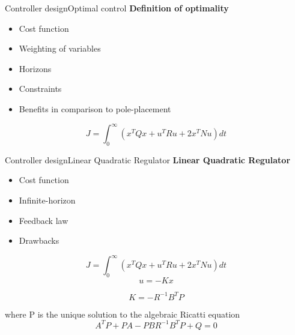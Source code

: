 \begin{frame}{Controller design}{Optimal control}
	 \textbf{Definition of optimality}
	 \begin{itemize}
	 	\item Cost function
	 	\item Weighting of variables
	 	\item Horizons
	 	\item Constraints
	 	\item Benefits in comparison to pole-placement 
	 \end{itemize}
 
\begin{equation} \label{eq:lqr_cost_fcn}
	J = \int_0^{\infty} \left(x^TQx + u^TRu + 2x^TNu\right)dt
\end{equation}

\end{frame}


\begin{frame}{Controller design}{Linear Quadratic Regulator}
	 \textbf{Linear Quadratic Regulator}
	\begin{itemize}
		\item Cost function
		\item Infinite-horizon 
		\item Feedback law
		\item Drawbacks
	\end{itemize}

\begin{equation} \label{eq:lqr_cost_fcn}
	J = \int_0^{\infty} \left(x^TQx + u^TRu + 2x^TNu\right)dt
\end{equation}
\begin{equation} \label{eq:lqr_cost_fcn}
	u = -Kx
\end{equation}

\begin{equation} \label{eq:lqr_K}
	K = -R^{-1}B^{T}P
\end{equation}

where P is the unique solution to the algebraic Ricatti equation
\begin{equation} \label{eq:ricatti}
	A^TP + PA - PBR^{-1}B^TP+Q = 0
\end{equation}

\end{frame}



